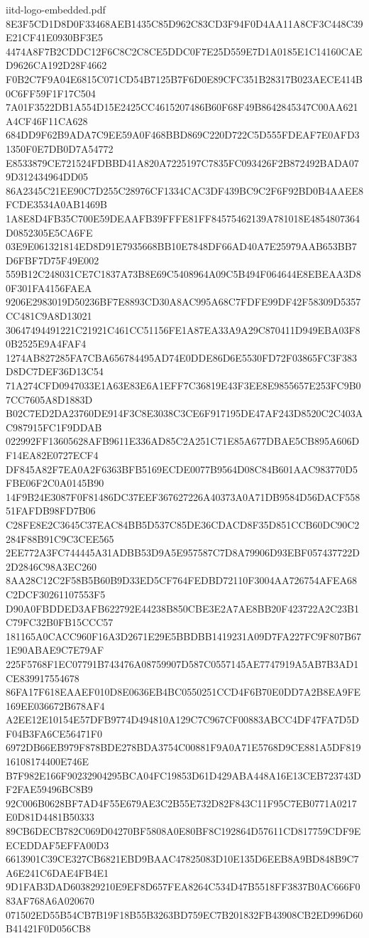 \begin{filecontents*}[overwrite]{iitd-logo-embedded.pdf}
8E3F5CD1D8D0F33468AEB1435C85D962C83CD3F94F0D4AA11A8CF3C448C39E21CF41E0930BF3E5
4474A8F7B2CDDC12F6C8C2C8CE5DDC0F7E25D559E7D1A0185E1C14160CAED9626CA192D28F4662
F0B2C7F9A04E6815C071CD54B7125B7F6D0E89CFC351B28317B023AECE414B0C6FF59F1F17C504
7A01F3522DB1A554D15E2425CC4615207486B60F68F49B8642845347C00AA621A4CF46F11CA628
684DD9F62B9ADA7C9EE59A0F468BBD869C220D722C5D555FDEAF7E0AFD31350F0E7DB0D7A54772
E8533879CE721524FDBBD41A820A7225197C7835FC093426F2B872492BADA079D312434964DD05
86A2345C21EE90C7D255C28976CF1334CAC3DF439BC9C2F6F92BD0B4AAEE8FCDE3534A0AB1469B
1A8E8D4FB35C700E59DEAAFB39FFFE81FF84575462139A781018E4854807364D0852305E5CA6FE
03E9E061321814ED8D91E7935668BB10E7848DF66AD40A7E25979AAB653BB7D6FBF7D75F49E002
559B12C248031CE7C1837A73B8E69C5408964A09C5B494F064644E8EBEAA3D80F301FA4156FAEA
9206E2983019D50236BF7E8893CD30A8AC995A68C7FDFE99DF42F58309D5357CC481C9A8D13021
30647494491221C21921C461CC51156FE1A87EA33A9A29C870411D949EBA03F80B2525E9A4FAF4
1274AB827285FA7CBA656784495AD74E0DDE86D6E5530FD72F03865FC3F383D8DC7DEF36D13C54
71A274CFD0947033E1A63E83E6A1EFF7C36819E43F3EE8E9855657E253FC9B07CC7605A8D1883D
B02C7ED2DA23760DE914F3C8E3038C3CE6F917195DE47AF243D8520C2C403AC987915FC1F9DDAB
022992FF13605628AFB9611E336AD85C2A251C71E85A677DBAE5CB895A606DF14EA82E0727ECF4
DF845A82F7EA0A2F6363BFB5169ECDE0077B9564D08C84B601AAC983770D5FBE06F2C0A0145B90
14F9B24E3087F0F81486DC37EEF367627226A40373A0A71DB9584D56DACF55851FAFDB98FD7B06
C28FE8E2C3645C37EAC84BB5D537C85DE36CDACD8F35D851CCB60DC90C2284F88B91C9C3CEE565
2EE772A3FC744445A31ADBB53D9A5E957587C7D8A79906D93EBF057437722D2D2846C98A3EC260
8AA28C12C2F58B5B60B9D33ED5CF764FEDBD72110F3004AA726754AFEA68C2DCF30261107553F5
D90A0FBDDED3AFB622792E44238B850CBE3E2A7AE8BB20F423722A2C23B1C79FC32B0FB15CCC57
181165A0CACC960F16A3D2671E29E5BBDBB1419231A09D7FA227FC9F807B671E90ABAE9C7E79AF
225F5768F1EC07791B743476A08759907D587C0557145AE7747919A5AB7B3AD1CE839917554678
86FA17F618EAAEF010D8E0636EB4BC0550251CCD4F6B70E0DD7A2B8EA9FE169EE036672B678AF4
A2EE12E10154E57DFB9774D494810A129C7C967CF00883ABCC4DF47FA7D5DF04B3FA6CE56471F0
6972DB66EB979F878BDE278BDA3754C00881F9A0A71E5768D9CE881A5DF81916108174400E746E
B7F982E166F90232904295BCA04FC19853D61D429ABA448A16E13CEB723743DF2FAE59496BC8B9
92C006B0628BF7AD4F55E679AE3C2B55E732D82F843C11F95C7EB0771A0217E0D81D4481B50333
89CB6DECB782C069D04270BF5808A0E80BF8C192864D57611CD817759CDF9EECEDDAF5EFFA00D3
6613901C39CE327CB6821EBD9BAAC47825083D10E135D6EEB8A9BD848B9C7A6E241C6DAE4FB4E1
9D1FAB3DAD603829210E9EF8D657FEA8264C534D47B5518FF3837B0AC666F083AF768A6A020670
071502ED55B54CB7B19F18B55B3263BD759EC7B201832FB43908CB2ED996D60B41421F0D056CB8

\end{filecontents*}
